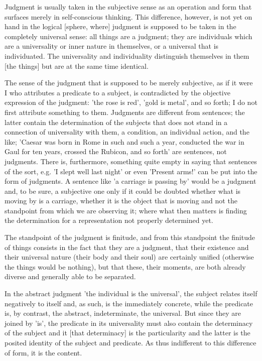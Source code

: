 Judgment is usually taken in the subjective sense as an operation and form
that surfaces merely in self-conscious thinking.
This difference, however, is not yet on hand in the logical [sphere, where]
judgment is supposed to be taken in the completely universal sense:
all things are a judgment;
they are individuals which are a universality or inner nature in themselves,
or a universal that is individuated. The universality and individuality
distinguish themselves in them [the things] but are at the same time identical.

    The sense of the judgment that is supposed to be merely subjective,
    as if it were I who attributes a predicate to a subject,
    is contradicted by the objective expression of the judgment:
    'the rose is red', 'gold is metal', and so forth;
    I do not first attribute something to them.
    Judgments are different from sentences;
    the latter contain the determination of the subjects
    that does not stand in a connection of universality with them,
    a condition, an individual action, and the like;
    'Caesar was born in Rome in such and such a year, conducted
    the war in Gaul for ten years, crossed the Rubicon, and so forth'
    are sentences, not judgments.
    There is, furthermore, something quite empty
    in saying that sentences of the sort, e.g.
    'I slept well last night' or even 'Present arms!'
    can be put into the form of judgments.
    A sentence like 'a carriage is passing by' would be a judgment
    and, to be sure, a subjective one only if it could be doubted
    whether what is moving by is a carriage,
    whether it is the object that is moving and not
    the standpoint from which we are observing it;
    where what then matters is finding the determination
    for a representation not properly determined yet.

The standpoint of the judgment is finitude, and from this standpoint the
finitude of things consists in the fact that they are a judgment,
that their existence and their universal nature (their body and their soul) are
certainly unified (otherwise the things would be nothing), but that these,
their moments, are both already diverse and generally able to be separated.

In the abstract judgment 'the individual is the universal',
the subject relates itself negatively to itself and, as such,
is the immediately concrete, while the predicate is, by contrast,
the abstract, indeterminate, the universal.
But since they are joined by 'is', the predicate in its universality
must also contain the determinacy of the subject
and it [that determinacy] is the particularity
and the latter is the posited identity of the subject and predicate.
As thus indifferent to this difference of form, it is the content.

